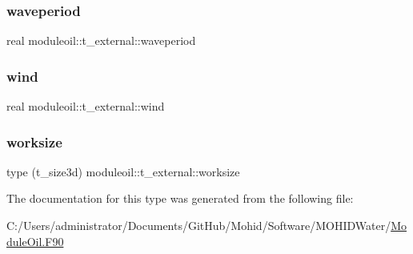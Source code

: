 \subsubsection{\texorpdfstring{waveperiod}{waveperiod}}
{\footnotesize\ttfamily real moduleoil\+::t\+\_\+external\+::waveperiod\hspace{0.3cm}{\ttfamily [private]}}

\mbox{\label{structmoduleoil_1_1t__external_a13c5cede1f01a870c22d136bf5cb9a40}} 
\subsubsection{\texorpdfstring{wind}{wind}}
{\footnotesize\ttfamily real moduleoil\+::t\+\_\+external\+::wind\hspace{0.3cm}{\ttfamily [private]}}

\mbox{\label{structmoduleoil_1_1t__external_a0a980eba0e168520e2260efbfdb0e62f}} 
\subsubsection{\texorpdfstring{worksize}{worksize}}
{\footnotesize\ttfamily type (t\+\_\+size3d) moduleoil\+::t\+\_\+external\+::worksize\hspace{0.3cm}{\ttfamily [private]}}



The documentation for this type was generated from the following file\+:\begin{DoxyCompactItemize}
\item 
C\+:/\+Users/administrator/\+Documents/\+Git\+Hub/\+Mohid/\+Software/\+M\+O\+H\+I\+D\+Water/\mbox{\hyperlink{_module_oil_8_f90}{Module\+Oil.\+F90}}\end{DoxyCompactItemize}
